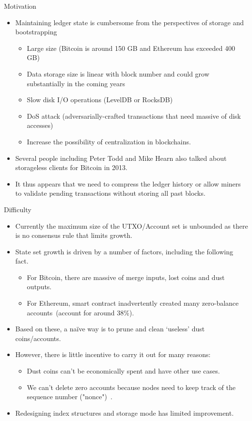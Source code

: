 \documentclass[biblatex,aspectratio=169,11pt]{mybeamer}
\begin{document}
\begin{frame}{Motivation}
  \begin{itemize}
    \item Maintaining ledger state is cumbersome from the perspectives of \alert{storage} and \alert{bootstrapping}
    \begin{itemize}
       \item Large size (Bitcoin is around 150 GB and Ethereum has exceeded 400 GB)
       \item Data storage size is linear with block number and could grow substantially in the coming years
       \item Slow disk I/O operations (LevelDB or RocksDB)
       \item DoS attack (adversarially-crafted transactions that need massive of disk accesses)
       \item Increase the possibility of centralization in blockchains.
    \end{itemize}
    \item Several people including Peter Todd and Mike Hearn also talked about \alert{storageless clients} for Bitcoin in 2013.
    \item It thus appears that we need to compress the \alert{ledger history} or allow miners to validate pending transactions without storing all past blocks. 
  \end{itemize}
\end{frame}

\begin{frame}{Difficulty}
  \begin{itemize}
    \item Currently the maximum size of the UTXO/Account set is unbounded as there is no consensus rule that limits growth.
    \item State set growth is driven by a number of factors, including the following fact.
     \begin{itemize}
       \item For \alert{Bitcoin}, there are massive of merge inputs, lost coins and dust outputs.
       \item For \alert{Ethereum}, smart contract inadvertently created many \alert{zero-balance accounts}~(account for around 38\%).
     \end{itemize}
    \item Based on these, a na\"ive way is to prune and clean `useless' dust coins/accounts.
    \item However, there is little incentive to carry it out for many reasons:
     \begin{itemize}
       \item Dust coins can't be economically spent and have other use cases.
       \item We can't delete zero accounts because nodes need to keep track of the sequence number ("nonce")~\cite{wood2014ethereum}.
     \end{itemize}
    \item Redesigning index structures and storage mode has limited improvement.
  \end{itemize}
\end{frame}
\end{document}
